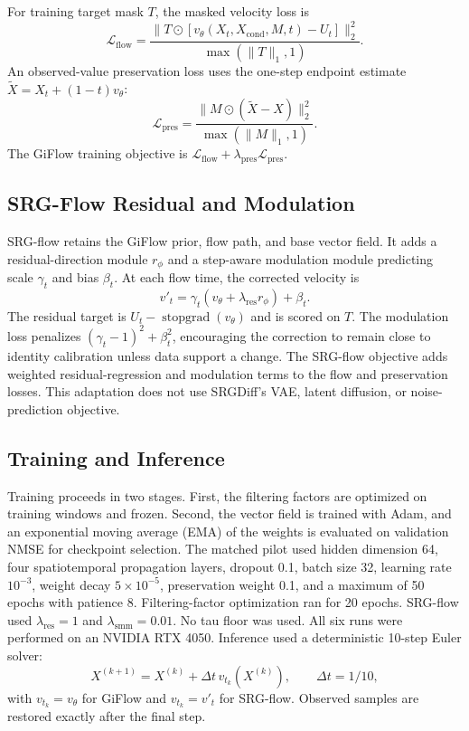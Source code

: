 \documentclass{article}
\begin{document}
For training target mask $T$, the masked velocity loss is
\begin{equation}
    \mathcal{L}_{\mathrm{flow}} =
    \frac{\|T\odot
    [v_{\theta}(X_t,X_{\mathrm{cond}},M,t)-U_t]\|_2^2}
    {\max(\|T\|_1,1)}.
    \label{eq:flow}
\end{equation}
An observed-value preservation loss uses the one-step endpoint estimate
$\widetilde{X}=X_t+(1-t)v_{\theta}$:
\begin{equation}
    \mathcal{L}_{\mathrm{pres}} =
    \frac{\|M\odot(\widetilde{X}-X)\|_2^2}
    {\max(\|M\|_1,1)}.
\end{equation}
The GiFlow training objective is
$\mathcal{L}_{\mathrm{flow}}+
\lambda_{\mathrm{pres}}\mathcal{L}_{\mathrm{pres}}$.

\subsection{SRG-Flow Residual and Modulation}

SRG-flow retains the GiFlow prior, flow path, and base vector field. It
adds a residual-direction module $r_{\phi}$ and a step-aware modulation
module predicting scale $\gamma_t$ and bias $\beta_t$. At each flow time,
the corrected velocity is
\begin{equation}
    v'_t =
    \gamma_t\left(v_{\theta}+
    \lambda_{\mathrm{res}}r_{\phi}\right)+\beta_t.
    \label{eq:srg}
\end{equation}
The residual target is
$U_t-\operatorname{stopgrad}(v_{\theta})$ and is scored on $T$. The
modulation loss penalizes $(\gamma_t-1)^2+\beta_t^2$, encouraging the
correction to remain close to identity calibration unless data support a
change. The SRG-flow objective adds weighted residual-regression and
modulation terms to the flow and preservation losses. This adaptation does
not use SRGDiff's VAE, latent diffusion, or noise-prediction objective.

\subsection{Training and Inference}

Training proceeds in two stages. First, the filtering factors are optimized
on training windows and frozen. Second, the vector field is trained with
Adam, and an exponential moving average (EMA) of the weights is evaluated
on validation NMSE for checkpoint selection. The matched pilot used hidden
dimension 64, four spatiotemporal propagation layers, dropout 0.1, batch
size 32, learning rate $10^{-3}$, weight decay $5\times 10^{-5}$,
preservation weight 0.1, and a maximum of 50 epochs with patience 8.
Filtering-factor optimization ran for 20 epochs. SRG-flow used
$\lambda_{\mathrm{res}}=1$ and $\lambda_{\mathrm{smm}}=0.01$. No tau floor
was used. All six runs were performed on an NVIDIA RTX 4050. Inference used
a deterministic 10-step Euler solver:
\begin{equation}
    X^{(k+1)}=X^{(k)}+\Delta t\,v_{t_k}(X^{(k)}),
    \qquad \Delta t=1/10,
\end{equation}
with $v_{t_k}=v_{\theta}$ for GiFlow and $v_{t_k}=v'_t$ for SRG-flow.
Observed samples are restored exactly after the final step.
\end{document}
